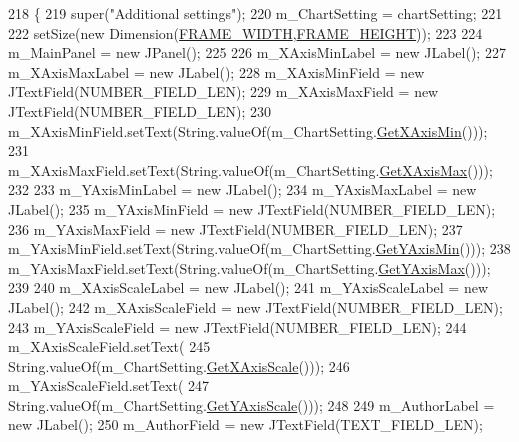 \begin{DoxyCode}
218                                                          \{
219         super(\textcolor{stringliteral}{"Additional settings"});
220         m\_ChartSetting = chartSetting;
221         
222         setSize(\textcolor{keyword}{new} Dimension(\hyperlink{class_more_setting_j_panel_a09bffa47a9133c9966cf18961bf3a46e}{FRAME\_WIDTH},\hyperlink{class_more_setting_j_panel_affa56095abc301bb764a5711fd097ac8}{FRAME\_HEIGHT}));
223         
224         m\_MainPanel = \textcolor{keyword}{new} JPanel();
225         
226         m\_XAxisMinLabel = \textcolor{keyword}{new} JLabel();
227         m\_XAxisMaxLabel = \textcolor{keyword}{new} JLabel();
228         m\_XAxisMinField = \textcolor{keyword}{new} JTextField(NUMBER\_FIELD\_LEN);
229         m\_XAxisMaxField = \textcolor{keyword}{new} JTextField(NUMBER\_FIELD\_LEN);
230         m\_XAxisMinField.setText(String.valueOf(m\_ChartSetting.\hyperlink{class_data_attribute_afa9da883abc4abad5f64c045de114c50}{GetXAxisMin}()));
231         m\_XAxisMaxField.setText(String.valueOf(m\_ChartSetting.\hyperlink{class_data_attribute_ada370712422c7cbd21b7be4a0d88caf7}{GetXAxisMax}()));
232         
233         m\_YAxisMinLabel = \textcolor{keyword}{new} JLabel();
234         m\_YAxisMaxLabel = \textcolor{keyword}{new} JLabel();
235         m\_YAxisMinField = \textcolor{keyword}{new} JTextField(NUMBER\_FIELD\_LEN);
236         m\_YAxisMaxField = \textcolor{keyword}{new} JTextField(NUMBER\_FIELD\_LEN);
237         m\_YAxisMinField.setText(String.valueOf(m\_ChartSetting.\hyperlink{class_data_attribute_af0786b4de674874c0bb8ca9dbe1519c6}{GetYAxisMin}()));
238         m\_YAxisMaxField.setText(String.valueOf(m\_ChartSetting.\hyperlink{class_data_attribute_a81243eb8f7008e05e74b0f3571d2f08d}{GetYAxisMax}()));
239         
240         m\_XAxisScaleLabel = \textcolor{keyword}{new} JLabel();
241         m\_YAxisScaleLabel = \textcolor{keyword}{new} JLabel();
242         m\_XAxisScaleField = \textcolor{keyword}{new} JTextField(NUMBER\_FIELD\_LEN);
243         m\_YAxisScaleField = \textcolor{keyword}{new} JTextField(NUMBER\_FIELD\_LEN);
244         m\_XAxisScaleField.setText(
245                 String.valueOf(m\_ChartSetting.\hyperlink{class_data_attribute_a5a1de25600487aa958a19ce01151fea4}{GetXAxisScale}()));
246         m\_YAxisScaleField.setText(
247                 String.valueOf(m\_ChartSetting.\hyperlink{class_data_attribute_a95259727ce91efc0e0eaa28487d944c5}{GetYAxisScale}()));
248         
249         m\_AuthorLabel = \textcolor{keyword}{new} JLabel();
250         m\_AuthorField = \textcolor{keyword}{new} JTextField(TEXT\_FIELD\_LEN);

\end{DoxyCode}
